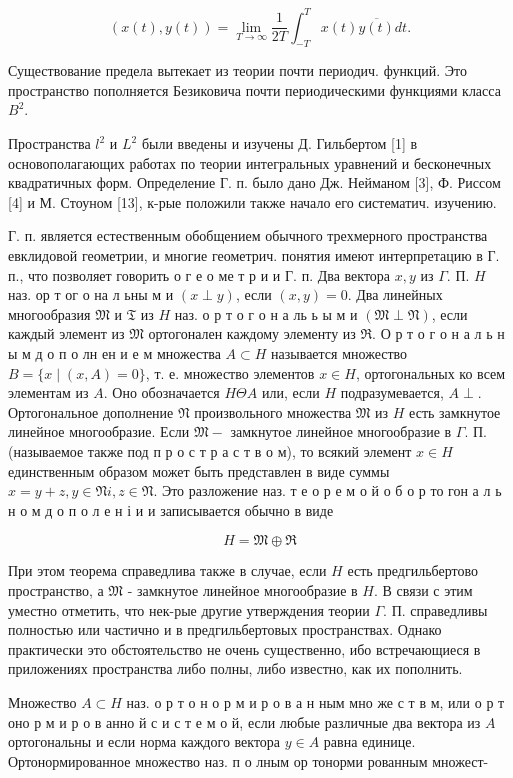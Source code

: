 \documentclass[10pt]{article}
\begin{document}
\[

(x(t), y(t))=\lim _{T \rightarrow \infty} \frac{1}{2 T} \int_{-T}^{T} x(t) \overline{y(t)} d t .

\]



Существование предела вытекает из теории почти периодич. функций. Это пространство пополняется Безиковича почти периодическими функциями класса $B^{2}$.



Пространства $l^{2}$ и $L^{2}$ были введены и изучены Д. Гильбертом [1] в основополагающих работах по теории интегральных уравнений и бесконечных квадратичных форм. Определение Г. п. было дано Дж. Нейманом [3], Ф. Риссом [4] и М. Стоуном [13], к-рые положили также начало его систематич. изучению.



Г. п. является естественным обобщением обычного трехмерного пространства евклидовой геометрии, и многие геометрич. понятия имеют интерпретацию в Г. п., что позволяет говорить о г е о ме т р и и $Г$. п. Два вектора $x, y$ из $\Gamma$. П. $H$ наз. ор т ог о на л ьны м и $(x \perp y)$, если $(x, y)=0$. Два линейных многообразия $\mathfrak{M}$ и $\mathfrak{T}$ из $H$ наз. о р т о г о н а ль ь ы м и $(\mathfrak{M} \perp \mathfrak{N})$, если каждый элемент из $\mathfrak{M}$ ортогонален каждому элементу из $\mathfrak{R}$. О р т о г о н а л ь н ы м д о п о лн ен и е м множества $A \subset H$ называется множество $B=\{x \mid(x, A)=0\}$, т. е. множество элементов $x \in H$, ортогональных ко всем элементам из $A$. Оно обозначается $H \Theta A$ или, если $H$ подразумевается, $A \perp$. Ортогональное дополнение $\mathfrak{N}$ произвольного множества $\mathfrak{M}$ из $H$ есть замкнутое линейное многообразие. Если $\mathfrak{M}-$ замкнутое линейное многообразие в $\Gamma$. П. (называемое также под п р о с т р а с т в о м), то всякий элемент $x \in H$ единственным образом может быть представлен в виде суммы $x=y+z, y \in \mathfrak{N} i, z \in \mathfrak{N}$. Это разложение наз. т е о р е м о й о б о р то гон а л ь н о м д о п о л е н і и и записывается обычно в виде



\[

H=\mathfrak{M} \oplus \mathfrak{R}

\]



При этом теорема справедлива также в случае, если $H$ есть предгильбертово пространство, а $\mathfrak{M}$ - замкнутое линейное многообразие в $H$. В связи с этим уместно отметить, что нек-рые другие утверждения теории $\Gamma$. П. справедливы полностью или частично и в предгильбертовых пространствах. Однако практически это обстоятельство не очень существенно, ибо встречающиеся в приложениях пространства либо полны, либо известно, как их пополнить.



Множество $A \subset H$ наз. о р т о н о р м и р о в а н ным мно же с т в м, или о р т оно р м и р о в анно й с и с т е м о й, если любые различные два вектора из $A$ ортогональны и если норма каждого вектора $y \in A$ равна единице. Ортонормированное множество наз. п о лным ор тонорми рованным множест-
\end{document}
